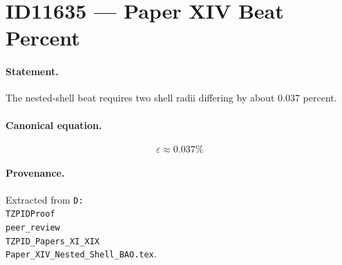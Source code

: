 \section*{ID11635 --- Paper XIV Beat Percent}

\paragraph{Statement.}
The nested-shell beat requires two shell radii differing by about 0.037 percent.

\paragraph{Canonical equation.}
\[
\varepsilon\approx0.037\%
\]

\paragraph{Provenance.}
Extracted from \texttt{D:\\TZPIDProof\\peer\_review\\TZPID\_Papers\_XI\_XIX\\Paper\_XIV\_Nested\_Shell\_BAO.tex}.
